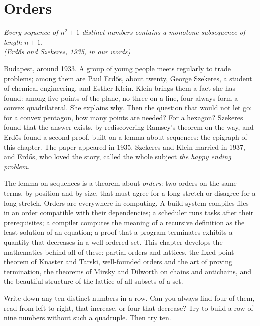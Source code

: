 \chapter{Orders}

\begin{center}\itshape
Every sequence of $n^2+1$ distinct numbers contains a monotone subsequence of length $n+1$.\\
\upshape(Erd\H os and Szekeres, 1935, in our words)
\end{center}

Budapest, around 1933. A group of young people meets regularly to trade
problems; among them are Paul Erd\H os, about twenty, George Szekeres, a student of chemical engineering, and Esther Klein.
Klein brings them a fact she has found: among five points of the plane, no three on a line, four always form a
convex quadrilateral. She explains why. Then the question that would not let go: for a
convex pentagon, how many points are needed? For a hexagon? Szekeres found that the answer exists, by rediscovering
Ramsey's theorem on the way, and Erd\H os found a second proof, built on a lemma about sequences: the epigraph of this
chapter. The paper appeared in 1935. Szekeres and Klein married in 1937, and Erd\H os, who loved the story, called the
whole subject \emph{the happy ending problem}.

The lemma on sequences is a theorem about \emph{orders}: two orders on the same terms, by position and by size,
that must agree for a long stretch or disagree for a long stretch. Orders are everywhere in computing. A build system
compiles files in an order compatible with their dependencies; a scheduler runs tasks after their prerequisites; a
compiler computes the meaning of a recursive definition as the least solution of an equation; a proof that a program
terminates exhibits a quantity that decreases in a well-ordered set. This chapter develops the mathematics behind all
of these: partial orders and lattices, the fixed point theorem of Knaster and Tarski, well-founded orders and the art
of proving termination, the theorems of Mirsky and Dilworth on chains and antichains, and the beautiful structure of
the lattice of all subsets of a set.

\begin{think}
Write down any ten distinct numbers in a row. Can you always find four of them, read from left to right, that increase,
or four that decrease? Try to build a row of nine numbers without such a quadruple. Then try ten.
\end{think}

